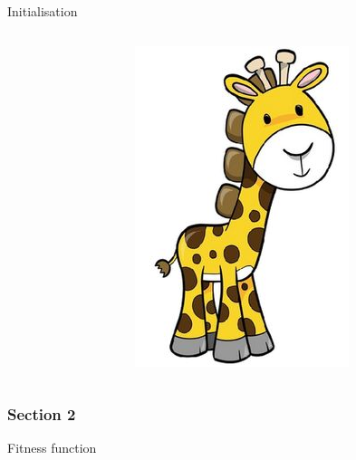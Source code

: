 \documentclass[24pt]{beamer}
\begin{document}
\begin{frame}{Initialisation}
\begin{columns}
\begin{figure}
                \end{figure}
                \begin{figure}
                \includegraphics[scale=0.1]{giraffe}
                \end{figure}
        \end{columns}
    \end{frame}

    \begin{centering}
        \begin{frame}[c]{}
            \frametitle{Section 2}
            Fitness function
        \end{frame}
    \end{centering}
\end{document}
